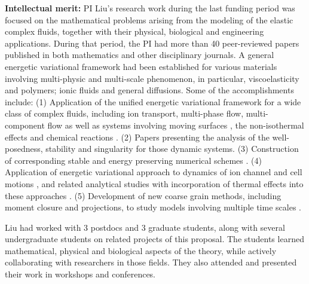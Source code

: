 \documentclass[11pt]{NSFamsart}
\begin{document}
\noindent\textbf{Intellectual merit:}  
PI Liu's research work during the last funding period was focused on the mathematical problems
arising from the modeling of the elastic complex fluids, together
with their physical, biological and engineering applications.
During that period, the PI had more than 40 peer-reviewed papers published in both mathematics and  other disciplinary journals. A general energetic variational framework had been established for various materials
involving multi-physic and multi-scale phenomenon,  in particular, viscoelasticity and polymers;  ionic fluids and general diffusions.
Some of the accomplishments include: (1) Application of the unified energetic variational framework for a wide class of complex fluids, including ion transport, multi-phase flow,
multi-component flow as well as systems involving moving  surfaces \cite{HuLiLi18,
yang_thermodynamically_2018,benesova_existence_2018, deng_largest_2017,xu_strong_2017,benesova_existence_2018,liu_energetic_2019, Kirshtein2020}, the non-isothermal effects \cite{de2019non,liu2018non, hsieh2020global, Jan-Eric}
and chemical reactions \cite{terebus2018discrete, wang2020field}. 
(2) Papers \cite{liu_energetic_2019, epshteyn2019large, Jan-Eric, hsieh2020global} presenting the analysis of the well-posedness, stability and singularity
for those dynamic systems. (3) Construction of corresponding stable and energy preserving numerical schemes \cite{duan_numerical_2019,xu_numerical_2019,duan_numerical_2019-2, wu2019energetic, liu2020lagrangian, liu2020variational, liu2020structure,duan2020structure}.
 (4)  Application of energetic variational approach to dynamics of ion channel and cell motions \cite{horng_continuum_2019,gavish_bistable_2018, liu_generalized_2017},
and related analytical studies \cite{WaLiTa17, hsieh2020global} with incorporation of thermal effects into these approaches \cite{liu2018non, wu2019energetic, hsieh2020global}.  (5) Development of new coarse grain  methods, including moment closure and projections, to study models involving multiple time scales
\cite{ma_fluctuation-dissipation_2017,ma_coarse-graining_2019}.


  Liu had worked with
3 postdocs and 3 graduate students, along with several undergraduate students 
on related projects of this proposal. 
The students learned mathematical, physical and biological
aspects of the theory, while actively collaborating  with researchers in those fields.
They also attended and presented their work in workshops and conferences.
\end{document}
